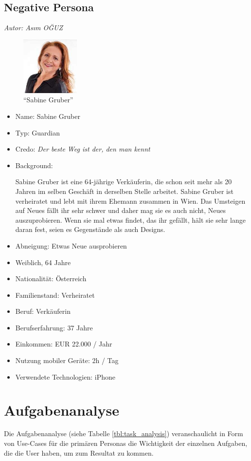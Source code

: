 \documentclass[12pt,paper=a4,oneside,hidelinks,headings=small,captions=heading,captions=nooneline]{scrartcl}
\begin{document}
\subsection{Negative Persona}
\label{sec:orge806d6e}

\emph{Autor: Asım OĞUZ}

\begin{figure}[htbp]
\centering
\includegraphics[width=110px]{./img/m1_persona_4_guardian.jpg}
\caption{\label{fig:persona4}"`Sabine Gruber"'}
\end{figure}

\begin{itemize}
\item Name: Sabine Gruber
\item Typ: Guardian
\item Credo: \emph{Der beste Weg ist der, den man kennt}
\item Background:

Sabine Gruber ist eine 64-jährige Verkäuferin, die schon seit mehr
als 20 Jahren im selben Geschäft in derselben Stelle
arbeitet. Sabine Gruber ist verheiratet und lebt mit ihrem Ehemann
zusammen in Wien. Das Umsteigen auf Neues fällt ihr sehr schwer und
daher mag sie es auch nicht, Neues auszuprobieren. Wenn sie mal
etwas findet, das ihr gefällt, hält sie sehr lange daran fest, seien
es Gegenstände als auch Designs.

\item Abneigung: Etwas Neue ausprobieren
\item Weiblich, 64 Jahre
\item Nationalität: Österreich
\item Familienstand: Verheiratet
\item Beruf: Verkäuferin
\item Berufserfahrung: 37 Jahre
\item Einkommen: EUR 22.000 / Jahr
\item Nutzung mobiler Geräte: 2h / Tag
\item Verwendete Technologien: iPhone
\end{itemize}
\section{Aufgabenanalyse}
\label{sec:org0c54022}
Die Aufgabenanalyse (siehe Tabelle \ref{tbl:task_analysis}) veranschaulicht in Form von Use-Cases für die
primären Personas die Wichtigkeit der einzelnen Aufgaben, die die User
haben, um zum Resultat zu kommen.
\end{document}
